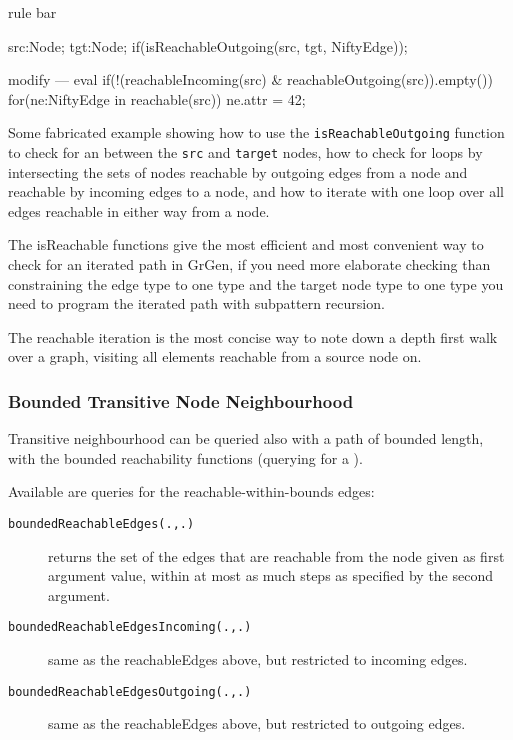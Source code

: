 \begin{example}
\begin{grgen}
rule bar {
    src:Node; 
    tgt:Node;
    if(isReachableOutgoing(src, tgt, NiftyEdge));
    
    modify {
    ---
        eval {
            if(!(reachableIncoming(src) & reachableOutgoing(src)).empty())
            {
                for(ne:NiftyEdge in reachable(src))
                {
                    ne.attr = 42;
                }
            }
        }
    }
}
\end{grgen}
Some fabricated example showing how to use the \texttt{isReachableOutgoing} function to check for an  between the \texttt{src} and \texttt{target} nodes, how to check for loops by intersecting the sets of nodes reachable by outgoing edges from a node and reachable by incoming edges to a node, and how to iterate with one loop over all edges reachable in either way from a node.

The isReachable functions give the most efficient and most convenient way to check for an iterated path in GrGen, if you need more elaborate checking than constraining the edge type to one type and the target node type to one type you need to program the iterated path with subpattern recursion.

The reachable iteration is the most concise way to note down a depth first walk over a graph, visiting all elements reachable from a source node on.
\end{example}

\subsubsection*{Bounded Transitive Node Neighbourhood}\label{transitiveneighbourbounded}

Transitive neighbourhood can be queried also with a path of bounded length, with the bounded reachability functions (querying for a ).

Available are queries for the reachable-within-bounds edges:

\begin{description}
\item[\texttt{boundedReachableEdges(.,.)}] returns the set of the edges that are reachable from the node given as first argument value, within at most as much steps as specified by the second argument.
\item[\texttt{boundedReachableEdgesIncoming(.,.)}] same as the reachableEdges above, but restricted to incoming edges.
\item[\texttt{boundedReachableEdgesOutgoing(.,.)}] same as the reachableEdges above, but restricted to outgoing edges.
\end{description}

